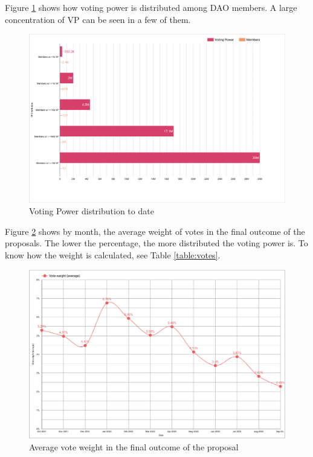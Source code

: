 \documentclass[MSE,Master,english]{twbook}%
\begin{document}
Figure \ref{fig:vp_distribution_members} shows how voting power is distributed among DAO members. A large concentration of VP can be seen in a few of them.
\begin{figure}[H]
  \centering
  \includegraphics[width=\textwidth]{metrics/vp_distribution_members.png}
  \caption{Voting Power distribution to date}
  \label{fig:vp_distribution_members}
\end{figure}

Figure \ref{fig:vote_weight} shows by month, the average weight of votes in the final outcome of the proposals. The lower the percentage, the more distributed the voting power is. To know how the weight is calculated, see Table \ref{table:votes}.
\begin{figure}[H]
  \centering
  \includegraphics[width=\textwidth]{metrics/vote_weight.png}
  \caption{Average vote weight in the final outcome of the proposal}
  \label{fig:vote_weight}
\end{figure}
\end{document}
